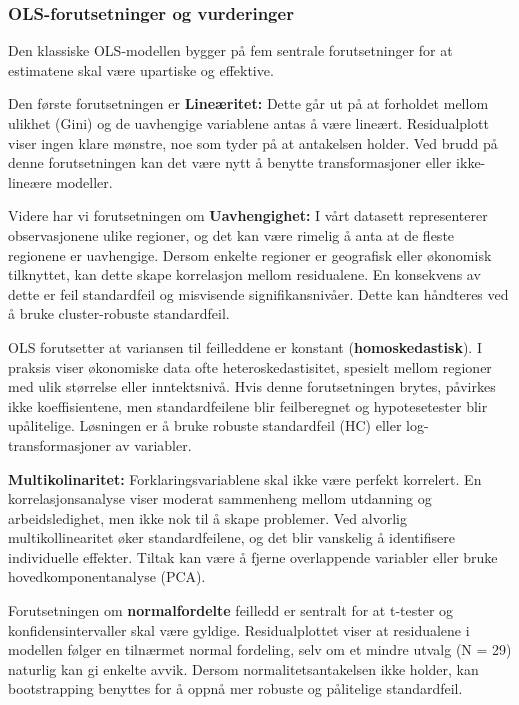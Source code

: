 \documentclass[
  letterpaper,
  DIV=11,
  numbers=noendperiod]{scrartcl}
\begin{document}
\subsubsection{OLS-forutsetninger og
vurderinger}\label{ols-forutsetninger-og-vurderinger}

Den klassiske OLS-modellen bygger på fem sentrale forutsetninger for at
estimatene skal være upartiske og effektive.

Den første forutsetningen er \textbf{Lineæritet:} Dette går ut på at
forholdet mellom ulikhet (Gini) og de uavhengige variablene antas å være
lineært. Residualplott viser ingen klare mønstre, noe som tyder på at
antakelsen holder. Ved brudd på denne forutsetningen kan det være nytt å
benytte transformasjoner eller ikke-lineære modeller.

Videre har vi forutsetningen om \textbf{Uavhengighet:} I vårt datasett
representerer observasjonene ulike regioner, og det kan være rimelig å
anta at de fleste regionene er uavhengige. Dersom enkelte regioner er
geografisk eller økonomisk tilknyttet, kan dette skape korrelasjon
mellom residualene. En konsekvens av dette er feil standardfeil og
misvisende signifikansnivåer. Dette kan håndteres ved å bruke
cluster-robuste standardfeil.

OLS forutsetter at variansen til feilleddene er konstant
(\textbf{homoskedastisk}). I praksis viser økonomiske data ofte
heteroskedastisitet, spesielt mellom regioner med ulik størrelse eller
inntektsnivå. Hvis denne forutsetningen brytes, påvirkes ikke
koeffisientene, men standardfeilene blir feilberegnet og hypotesetester
blir upålitelige. Løsningen er å bruke robuste standardfeil (HC) eller
log-transformasjoner av variabler.

\textbf{Multikolinaritet:} Forklaringsvariablene skal ikke være perfekt
korrelert. En korrelasjonsanalyse viser moderat sammenheng mellom
utdanning og arbeidsledighet, men ikke nok til å skape problemer. Ved
alvorlig multikollinearitet øker standardfeilene, og det blir vanskelig
å identifisere individuelle effekter. Tiltak kan være å fjerne
overlappende variabler eller bruke hovedkomponentanalyse (PCA).

Forutsetningen om \textbf{normalfordelte} feilledd er sentralt for at
t-tester og konfidensintervaller skal være gyldige. Residualplottet
viser at residualene i modellen følger en tilnærmet normal fordeling,
selv om et mindre utvalg (N = 29) naturlig kan gi enkelte avvik. Dersom
normalitetsantakelsen ikke holder, kan bootstrapping benyttes for å
oppnå mer robuste og pålitelige standardfeil.
\end{document}
